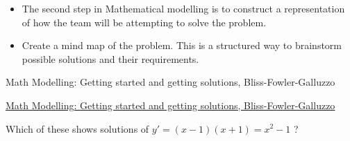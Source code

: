 \begin{lesson}

	\begin{itemize}
		\item The second step in Mathematical modelling is to construct a representation of how the team will be attempting to solve the problem.
		\item Create a mind map of the problem. This is a structured way to brainstorm possible solutions and their requirements.
	\end{itemize}
	

\begin{annotation}
	\begin{goals}
	Math Modelling: Getting started and getting solutions, Bliss-Fowler-Galluzzo
	
	\hfill {}	
	\end{goals}
\end{annotation}
	 \href{https://m3challenge.siam.org/resources/modeling-handbook}{Math Modelling: Getting started and getting solutions, Bliss-Fowler-Galluzzo}

\end{lesson}




\newpage

\question

Which of these shows solutions of $y' = (x-1)(x+1) = x^2 - 1$ ?

